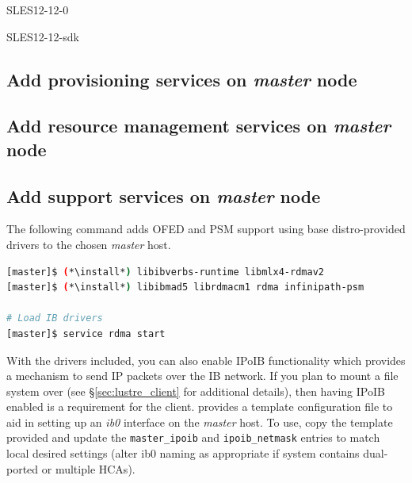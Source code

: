 \documentclass[letterpaper]{article}
\newcommand{\install}{zypper -n install}
\begin{document}
\begin{itemize*}
\item SLES12-12-0
\item SLES12-12-sdk
\end{itemize*}

\subsection{Add provisioning services on {\em master} node} \label{sec:add_provisioning}


\subsection{Add resource management services on {\em master} node} \label{sec:add_rm}


\subsection{Add \InfiniBand{} support services on {\em master} node} \label{sec:add_ofed}

The following command adds OFED and PSM support using base distro-provided drivers to the
chosen {\em master} host. 

\begin{lstlisting}[language=bash,keywords={}]
[master]$ (*\install*) libibverbs-runtime libmlx4-rdmav2
[master]$ (*\install*) libibmad5 librdmacm1 rdma infinipath-psm

# Load IB drivers
[master]$ service rdma start
\end{lstlisting}

With the \InfiniBand{} drivers included, you can also enable IPoIB functionality
which provides a mechanism to send IP packets over the IB network. If you plan
to mount a \Lustre{} file system over \InfiniBand{} (see \S\ref{sec:lustre_client}
for additional details), then having IPoIB enabled is a requirement for the
\Lustre{} client. \FSP{} provides a template configuration file to aid in setting up
an {\em ib0} interface on the {\em master} host. To use, copy the template
provided and update the \texttt{master\_ipoib} and
\texttt{ipoib\_netmask} entries to match local desired settings (alter ib0
naming as appropriate if system contains dual-ported or multiple HCAs). 
\end{document}
